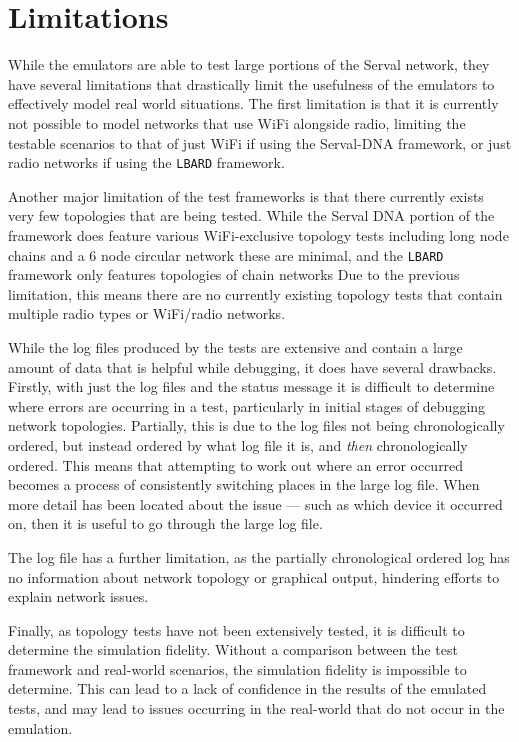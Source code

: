 \section{Limitations}
While the emulators are able to test large portions of the Serval network, they have several limitations that drastically limit the usefulness of the emulators to effectively model real world situations.
The first limitation is that it is currently not possible to model networks that use WiFi alongside radio, limiting the testable scenarios to that of just WiFi if using the Serval-DNA framework, or just radio networks if using the \texttt{LBARD} framework.

Another major limitation of the test frameworks is that there currently exists very few topologies that are being tested.
While the Serval DNA portion of the framework does feature various WiFi-exclusive topology tests including long node chains and a 6 node circular network these are minimal,
and the \texttt{LBARD} framework only features topologies of chain networks
Due to the previous limitation, this means there are no currently existing topology tests that contain multiple radio types or WiFi/radio networks.

While the log files produced by the tests are extensive and contain a large amount of data that is helpful while debugging, it does have several drawbacks.
Firstly, with just the log files and the status message it is difficult to determine where errors are occurring in a test, particularly in initial stages of debugging network topologies.
Partially, this is due to the log files not being chronologically ordered, but instead ordered by what log file it is, and \emph{then} chronologically ordered.
This means that attempting to work out where an error occurred becomes a process of consistently switching places in the large log file.
When more detail has been located about the issue — such as which device it occurred on, then it is useful to go through the large log file.

The log file has a further limitation, as the partially chronological ordered log has no information about network topology or graphical output, hindering efforts to explain network issues.

Finally, as topology tests have not been extensively tested, it is difficult to determine the simulation fidelity.
Without a comparison between the test framework and real-world scenarios, the simulation fidelity is impossible to determine. 
This can lead to a lack of confidence in the results of the emulated tests, and may lead to issues occurring in the real-world that do not occur in the emulation.


